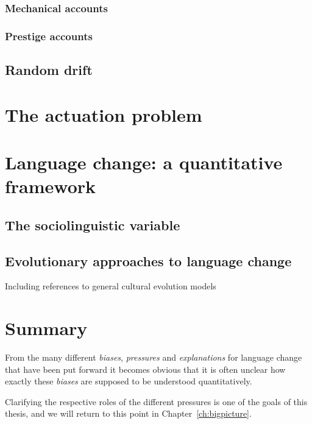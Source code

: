 \subsubsection{Mechanical accounts}


\subsubsection{Prestige accounts}

\subsection{Random drift}


\section{The actuation problem}


\section{Language change: a quantitative framework}

\subsection{The sociolinguistic variable}

\subsection{Evolutionary approaches to language change}

Including references to general cultural evolution models



\section{Summary}

From the many different \emph{biases}, \emph{pressures} and \emph{explanations} for language change that have been put forward it becomes obvious that it is often unclear how exactly these \emph{biases} are supposed to be understood quantitatively.

Clarifying the respective roles of the different pressures is one of the goals of this thesis, and we will return to this point in Chapter~\ref{ch:bigpicture}.
